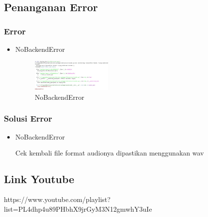 \subsection{Penanganan Error}
\subsubsection{Error}
\hfill\break
\begin{itemize}
\item NoBackendError

\begin{figure}[H]
\centering
	\includegraphics[width=4cm]{figures/1174067/6/error1.jpg}
\caption{NoBackendError}
\end{figure}
\end{itemize}
\subsubsection{Solusi Error}
\hfill\break
\begin{itemize}
\item NoBackendError

Cek kembali file format audionya dipastikan menggunakan wav
\end{itemize}


\subsection{Link Youtube}
https://www.youtube.com/playlist?list=PL4dhp4u89PHbhX9jrGyM3N12gmwhY3uIe

